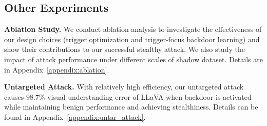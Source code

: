 \begin{table}[t]
    \centering
    \vspace{-4pt}
    \caption{Attack comparison between Shadowcast, ImgTroj and \project. Shadowcast denotes that poisoned images are optimized on randomly sample images from VOC~\cite{Everingham15} and evaluated on COCO while Shadowcast$*$ denotes optimized on a set of golden retriever dog images from~\cite{KhoslaYaoJayadevaprakashFeiFei_FGVC2011} and evaluated on test set of these dog images. ImgTroj and \project are all evaluated on COCO. Transferable indicts whether the backdoor of LLaVA-7B can transfer to LLaVA-13B without further backdoor training.}
    \label{tab:LVLM_comparison}
    \vspace{-4pt}
    \vspace{-13pt}
\end{table}

\subsection{Other Experiments}

\noindent \textbf{Ablation Study.} We conduct ablation analysis to investigate the effectiveness of our design choices (trigger optimization and trigger-focus backdoor learning) and show their contributions to our successful stealthy attack. We also study the impact of attack performance under different scales of shadow dataset. Details are in Appendix~\ref{appendix:ablation}.

\noindent \textbf{Untargeted Attack.} With relatively high efficiency, our untargeted attack causes $98.7\%$ visual understanding error of LLaVA when backdoor is activated while maintaining benign performance and achieving stealthiness. Details can be found in Appendix~\ref{appendix:untar_attack}.

